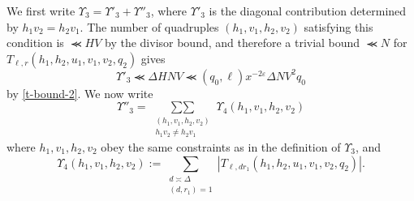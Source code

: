 \documentclass[12pt,a4paper,reqno]{amsart}
\numberwithin{equation}{section}
\theoremstyle{plain}
\theoremstyle{definition}
\newcommand\eps{\varepsilon}
\def\stacksum#1#2{{\stackrel{{\scriptstyle #1}}
{{\scriptstyle #2}}}}
\newcommand\sumsum{\mathop{\sum\sum}\limits}
\renewcommand{\sim}{\asymp}
\renewcommand{\lessapprox}{\llcurly}
\begin{document}

We first write $\Upsilon_3=\Upsilon'_3+\Upsilon''_3$, where
$\Upsilon'_3$ is the diagonal contribution determined by $h_1
v_2=h_2v_1$.  The number of quadruples $(h_1,v_1,h_2,v_2)$ satisfying
this condition is  $\lessapprox HV$ by the divisor bound, and
therefore a trivial bound $\lessapprox N$ for
$T_{\ell,r}(h_1,h_2,u_1,v_1,v_2,q_2)$ gives
$$
\Upsilon'_3\lessapprox \Delta HNV\lessapprox
(q_0,\ell)x^{-2\eps}\Delta NV^2q_0
$$
by \eqref{t-bound-2}. 
We now write
$$
\Upsilon''_3=\sumsum_{\substack{(h_1,v_1,h_2,v_2)\\
    h_1v_2\neq h_2v_1}} \Upsilon_4(h_1,v_1,h_2,v_2)
$$
where $h_1,v_1,h_2,v_2$ obey the same constraints as in the definition of $\Upsilon_3$, and
$$
\Upsilon_4(h_1,v_1,h_2,v_2):= \sum_{\substack{d\sim \Delta\\(d,r_1)=1}}
|T_{\ell,dr_1}(h_1,h_2,u_1,v_1,v_2,q_2)|.
$$
\end{document}

